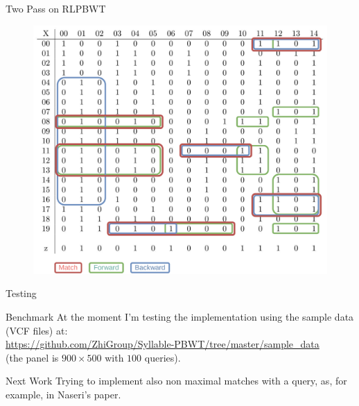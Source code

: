 \documentclass{beamer}
\begin{document}
\begin{frame}{Two Pass on RLPBWT}
{\begin{figure}[H]
      \includegraphics[scale = 0.3]{graph/bitravismatch.pdf}
    \end{figure}
  }
\end{frame}
\begin{frame}{Testing}
  \begin{block}{Benchmark}
    At the moment I'm testing the implementation using the sample data (VCF
    files) at:\\
    \small{\color{nordred}
      \url{https://github.com/ZhiGroup/Syllable-PBWT/tree/master/sample_data}}\\
    (the panel is $900\times 500$ with $100$ queries). 
  \end{block}
  \begin{alertblock}{Next Work}
    Trying to implement also non maximal matches with a query, as, for example,
    in Naseri's paper.
  \end{alertblock}
\end{frame}
\end{document}
